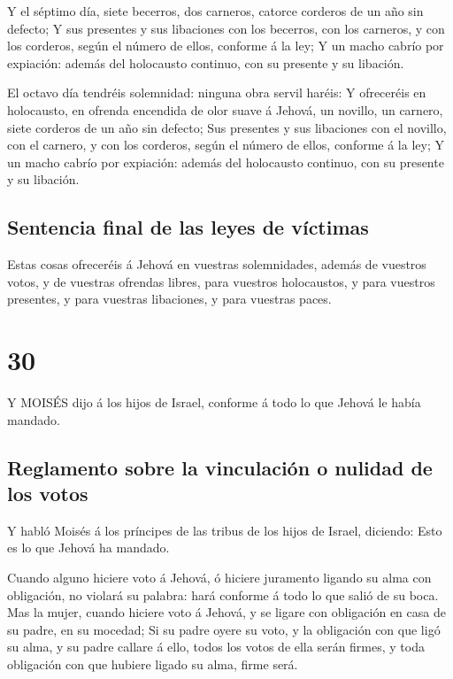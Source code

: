  Y el séptimo día, siete becerros, dos carneros, catorce
corderos de un año sin defecto;  Y sus presentes y sus
libaciones con los becerros, con los carneros, y con los corderos, según
el número de ellos, conforme á la ley;  Y un macho cabrío
por expiación: además del holocausto continuo, con su presente y su
libación.

 El octavo día tendréis solemnidad: ninguna obra servil
haréis:  Y ofreceréis en holocausto, en ofrenda encendida
de olor suave á Jehová, un novillo, un carnero, siete corderos de un año
sin defecto;  Sus presentes y sus libaciones con el
novillo, con el carnero, y con los corderos, según el número de ellos,
conforme á la ley;  Y un macho cabrío por expiación: además
del holocausto continuo, con su presente y su libación.

\hypertarget{sentencia-final-de-las-leyes-de-vuxedctimas}{%
\subsection{Sentencia final de las leyes de
víctimas}\label{sentencia-final-de-las-leyes-de-vuxedctimas}}

 Estas cosas ofreceréis á Jehová en vuestras solemnidades,
además de vuestros votos, y de vuestras ofrendas libres, para vuestros
holocaustos, y para vuestros presentes, y para vuestras libaciones, y
para vuestras paces. 

\hypertarget{section-29}{%
\section{30}\label{section-29}}

 Y MOISÉS dijo á los hijos de Israel, conforme á todo lo que
Jehová le había mandado.

\hypertarget{reglamento-sobre-la-vinculaciuxf3n-o-nulidad-de-los-votos}{%
\subsection{Reglamento sobre la vinculación o nulidad de los
votos}\label{reglamento-sobre-la-vinculaciuxf3n-o-nulidad-de-los-votos}}

 Y habló Moisés á los príncipes de las tribus de los hijos
de Israel, diciendo: Esto es lo que Jehová ha mandado.

 Cuando alguno hiciere voto á Jehová, ó hiciere juramento
ligando su alma con obligación, no violará su palabra: hará conforme á
todo lo que salió de su boca.  Mas la mujer, cuando hiciere
voto á Jehová, y se ligare con obligación en casa de su padre, en su
mocedad;  Si su padre oyere su voto, y la obligación con que
ligó su alma, y su padre callare á ello, todos los votos de ella serán
firmes, y toda obligación con que hubiere ligado su alma, firme será.

